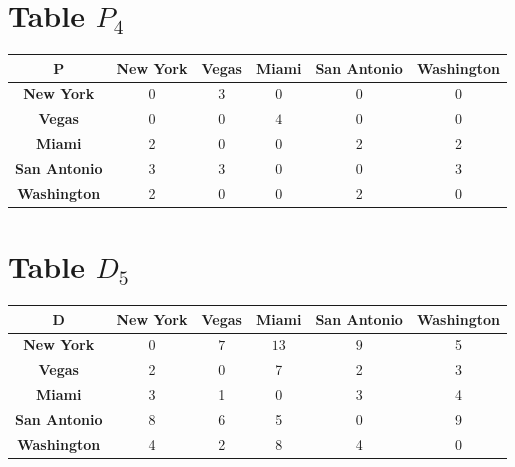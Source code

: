 \documentclass{article}
\begin{document}
\section{Table $P_{4}$}
\begin{center}
    \begin{tabular}{|c||c|c|c|c|c|}
        \hline
        \textbf{P} & \textbf{New York} & \textbf{Vegas} & \textbf{Miami} & \textbf{San Antonio} & \textbf{Washington} \\
        \hline
        \hline
        \textbf{New York}& 0 & 3 & 0 & 0 & 0 \\
        \hline
        \textbf{Vegas}& 0 & 0 & \cellcolor[HTML]{D74894}$4$ & 0 & 0 \\
        \hline
        \textbf{Miami}& 2 & 0 & 0 & 2 & 2 \\
        \hline
        \textbf{San Antonio}& 3 & 3 & 0 & 0 & 3 \\
        \hline
        \textbf{Washington}& 2 & 0 & 0 & 2 & 0 \\
        \hline
    \end{tabular}
\end{center}


\section{Table $D_{5}$}
\begin{center}
    \begin{tabular}{|c||c|c|c|c|c|}
        \hline
        \textbf{D} & \textbf{New York} & \textbf{Vegas} & \textbf{Miami} & \textbf{San Antonio} & \textbf{Washington} \\
        \hline
        \hline
        \textbf{New York}& 0 & \cellcolor[HTML]{D74894}$7$ & \cellcolor[HTML]{D74894}$13$ & \cellcolor[HTML]{D74894}$9$ & 5 \\
        \hline
        \textbf{Vegas}& 2 & 0 & 7 & 2 & 3 \\
        \hline
        \textbf{Miami}& 3 & 1 & 0 & 3 & 4 \\
        \hline
        \textbf{San Antonio}& 8 & 6 & 5 & 0 & 9 \\
        \hline
        \textbf{Washington}& 4 & 2 & 8 & 4 & 0 \\
        \hline
    \end{tabular}
\end{center}
\end{document}
